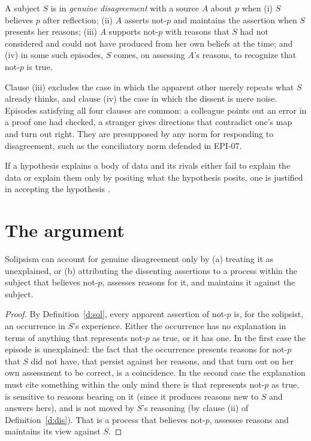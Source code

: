 \documentclass{situationist-preprint}
\begin{document}
\begin{definition}\label{d:dis}
A subject $S$ is in \emph{genuine disagreement} with a source $A$ about $p$ when (i) $S$ believes $p$ after reflection; (ii) $A$ asserts not-$p$ and maintains the assertion when $S$ presents her reasons; (iii) $A$ supports not-$p$ with reasons that $S$ had not considered and could not have produced from her own beliefs at the time; and (iv) in some such episodes, $S$ comes, on assessing $A$'s reasons, to recognize that not-$p$ is true.
\end{definition}

Clause (iii) excludes the case in which the apparent other merely repeats what $S$ already thinks, and clause (iv) the case in which the dissent is mere noise. Episodes satisfying all four clauses are common: a colleague points out an error in a proof one had checked, a stranger gives directions that contradict one's map and turn out right. They are presupposed by any norm for responding to disagreement, such as the conciliatory norm defended in EPI-07.

\begin{principle}\label{p:ibe}
If a hypothesis explains a body of data and its rivals either fail to explain the data or explain them only by positing what the hypothesis posits, one is justified in accepting the hypothesis \citep{Lipton2004}.
\end{principle}

\section{The argument}

\begin{lemma}\label{l:dilemma}
Solipsism can account for genuine disagreement only by (a) treating it as unexplained, or (b) attributing the dissenting assertions to a process within the subject that believes not-$p$, assesses reasons for it, and maintains it against the subject.
\end{lemma}

\begin{proof}
By Definition~\ref{d:sol}, every apparent assertion of not-$p$ is, for the solipsist, an occurrence in $S$'s experience. Either the occurrence has no explanation in terms of anything that represents not-$p$ as true, or it has one. In the first case the episode is unexplained: the fact that the occurrence presents reasons for not-$p$ that $S$ did not have, that persist against her reasons, and that turn out on her own assessment to be correct, is a coincidence. In the second case the explanation must cite something within the only mind there is that represents not-$p$ as true, is sensitive to reasons bearing on it (since it produces reasons new to $S$ and answers hers), and is not moved by $S$'s reasoning (by clause (ii) of Definition~\ref{d:dis}). That is a process that believes not-$p$, assesses reasons and maintains its view against $S$.
\end{proof}
\end{document}
